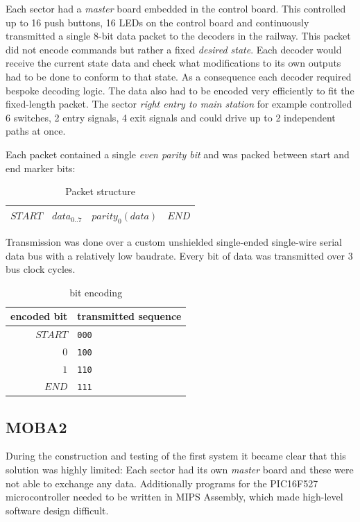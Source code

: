 \documentclass{scrreprt}
\begin{document}
Each sector had a \emph{master} board embedded in the control board.
This controlled up to 16 push buttons, 16 LEDs on the control board and continuously transmitted a single 8-bit data packet to the decoders in the railway.
This packet did not encode commands but rather a fixed \emph{desired state}.
Each decoder would receive the current state data and check what modifications to its own outputs had to be done to conform to that state.
As a consequence each decoder required bespoke decoding logic.
The data also had to be encoded very efficiently to fit the fixed-length packet.
The sector \emph{right entry to main station} for example controlled 6 switches, 2 entry signals, 4 exit signals and could drive up to 2 independent paths at once.

Each packet contained a single \emph{even parity bit} and was packed between start and end marker bits:

\begin{table}[ht!]
\centering
\begin{tabular}{ | c | c | c | c | }
\hline
$START$ & $data_{0..7}$ & $parity_0(data)$ & $END$ \\\hline
\end{tabular}
\caption{Packet structure}
\end{table}


Transmission was done over a custom unshielded single-ended single-wire serial data bus with a relatively low baudrate. Every bit of data was transmitted over 3 bus clock cycles.

\begin{table}[ht!]
\centering
\begin{tabular}{ | r | l | }
\hline
encoded bit & transmitted sequence \\\hline\hline
$START$ & \texttt{000} \\\hline
$0$     & \texttt{100} \\\hline
$1$     & \texttt{110} \\\hline
$END$   & \texttt{111} \\\hline
\end{tabular}
\caption{bit encoding}
\end{table}

\subsection{MOBA2}
During the construction and testing of the first system it became clear that this solution was highly limited:
Each sector had its own \emph{master} board and these were not able to exchange any data.
Additionally programs for the PIC16F527 microcontroller needed to be written in MIPS Assembly, which made high-level software design difficult.
\end{document}
